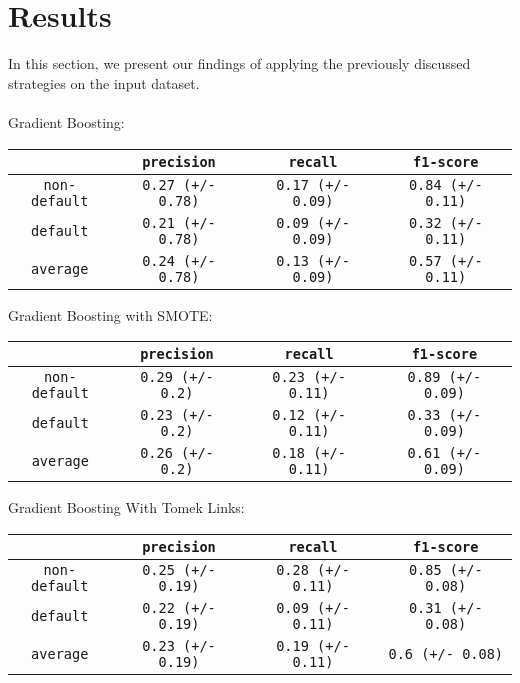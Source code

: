 \documentclass{article}
\begin{document}
\section{Results}\label{results}
	In this section, we present our findings of applying the previously discussed strategies on the input dataset.
	\\
	\\
	Gradient Boosting:
	\begin{center}
		\begin{tabular}{ |c|c|c|c| } 
			\hline
			& \texttt{precision} & \texttt{recall} & \texttt{f1-score} \\ 
			\hline
			\texttt{non-default} & \texttt{0.27 (+/- 0.78)} & \texttt{0.17 (+/- 0.09)} & \texttt{0.84 (+/- 0.11)}\\
			\texttt{default} & \texttt{0.21 (+/- 0.78)} & \texttt{0.09 (+/- 0.09)} & \texttt{0.32 (+/- 0.11)}\\ 
			\hline
			\texttt{average} & \texttt{0.24 (+/- 0.78)} & \texttt{0.13 (+/- 0.09)} & \texttt{0.57 (+/- 0.11)}\\
			\hline
		\end{tabular}
	\end{center}
	Gradient Boosting with SMOTE:
	\begin{center}
		\begin{tabular}{ |c|c|c|c| } 
			\hline
			& \texttt{precision} & \texttt{recall} & \texttt{f1-score} \\ 
			\hline
			\texttt{non-default} & \texttt{0.29 (+/- 0.2)} & \texttt{0.23 (+/- 0.11)} & \texttt{0.89 (+/- 0.09)}\\
			\texttt{default} & \texttt{0.23 (+/- 0.2)} & \texttt{0.12 (+/- 0.11)} & \texttt{0.33 (+/- 0.09)}\\ 
			\hline
			\texttt{average} & \texttt{0.26 (+/- 0.2)} & \texttt{0.18 (+/- 0.11)} & \texttt{0.61 (+/- 0.09)}\\
			\hline
		\end{tabular}
	\end{center}
	Gradient Boosting With Tomek Links:
	\begin{center}
		\begin{tabular}{ |c|c|c|c| } 
			\hline
			& \texttt{precision} & \texttt{recall} & \texttt{f1-score} \\ 
			\hline
			\texttt{non-default} & \texttt{0.25 (+/- 0.19)} & \texttt{0.28 (+/- 0.11)} & \texttt{0.85 (+/- 0.08)}\\
			\texttt{default} & \texttt{0.22 (+/- 0.19)} & \texttt{0.09 (+/- 0.11)} & \texttt{0.31 (+/- 0.08)}\\ 
			\hline
			\texttt{average} & \texttt{0.23 (+/- 0.19)} & \texttt{0.19 (+/- 0.11)} & \texttt{0.6 (+/- 0.08)}\\
			\hline
		\end{tabular}
	\end{center}
\end{document}
